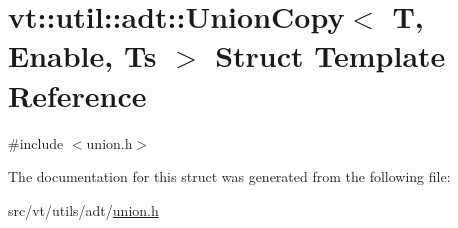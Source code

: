 \hypertarget{structvt_1_1util_1_1adt_1_1_union_copy}{}\section{vt\+:\+:util\+:\+:adt\+:\+:Union\+Copy$<$ T, Enable, Ts $>$ Struct Template Reference}
\label{structvt_1_1util_1_1adt_1_1_union_copy}


{\ttfamily \#include $<$union.\+h$>$}



The documentation for this struct was generated from the following file\+:\begin{DoxyCompactItemize}
\item 
src/vt/utils/adt/\hyperlink{union_8h}{union.\+h}\end{DoxyCompactItemize}

